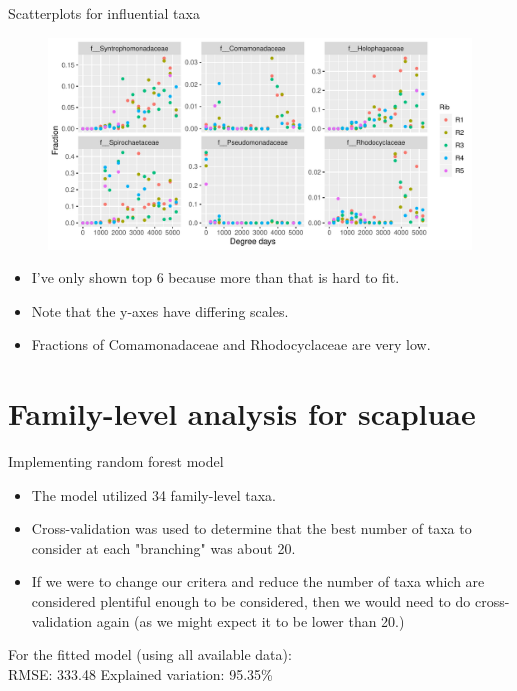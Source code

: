\documentclass{beamer}
\begin{document}
\begin{frame}{Scatterplots for influential taxa}

  \begin{center}
    \begin{figure}
      \includegraphics[width=4.75in]{use_families/w_ribs/infl_rib_family_scatter}
    \end{figure}
  \end{center}
  \vspace{-0.25in}
  {\scriptsize
  \begin{itemize}
  \item I've only shown top 6 because more than that is hard to fit.
  \item Note that the y-axes have differing scales.
  \item Fractions of Comamonadaceae and Rhodocyclaceae are very low.
  \end{itemize}
  }

\end{frame}


\section[Scapulae, family-level]{Family-level analysis for scapluae}

\begin{frame}{Implementing random forest model}

\begin{itemize}
\item The model utilized 34 family-level taxa.
\item Cross-validation was used to determine that the best number of taxa to
consider at each "branching" was about 20.
\item If we were to change our critera and reduce the number of taxa which are
considered plentiful enough to be considered, then we would need to do
cross-validation again (as we might expect it to be lower than 20.)
\end{itemize}

\vspace{0.1in}

\noindent For the fitted model (using all available data):\\
\noindent RMSE: 333.48  \hspace{0.05in}  Explained variation: 95.35\%


\end{frame}
\end{document}
